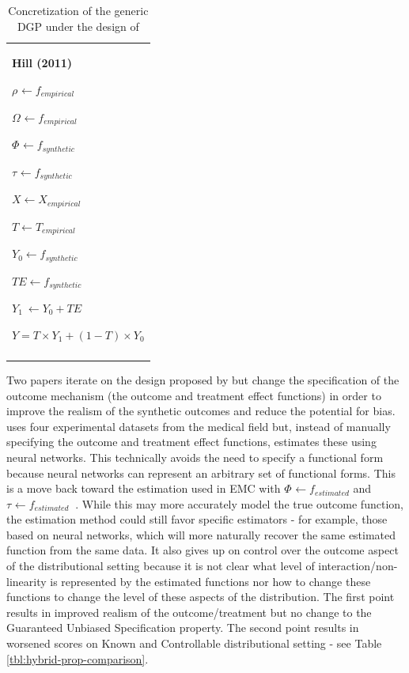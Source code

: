 \documentclass[../main.tex]{subfiles}
\begin{document}
\begin{table}[H]
             \centering
\begin{tabular}{p{3.14in}}
\hline
\multicolumn{1}{|p{3.14in}|}{\textbf{Hill (2011)} \par  \(  \rho _{} \leftarrow f_{empirical}~ \)  \par  \(  \Omega _{} \leftarrow f_{empirical} \)  \par  \(  \Phi _{} \leftarrow f_{synthetic} \)  \par  \(  \tau_{} \leftarrow f_{synthetic}~ \)  \par  \( X \leftarrow X_{empirical} \)  \par  \( T \leftarrow T_{empirical} \)  \par  \( Y_{0} \leftarrow f_{synthetic} \)  \par  \( TE \leftarrow f_{synthetic} \)  \par  \( Y_{1}~ \leftarrow Y_{0}+ TE \)  \par  \( Y = T \times Y_{1}+  \left( 1-T \right)  \times Y_{0} \)  \par } \\
\hhline{-}

\end{tabular}
\caption{Concretization of the generic DGP under the design of \textcite{Hill2011BayesianInference}}
\label{tbl:hill-hybrid}
\end{table}



\vspace{\baselineskip}
Two papers iterate on the design proposed by \textcite{Hill2011BayesianInference} but change the specification of the outcome mechanism (the outcome and treatment effect functions) in order to improve the realism of the synthetic outcomes and reduce the potential for bias. \textcite{Wendling2018ComparingDatabases} uses four experimental datasets from the medical field but, instead of manually specifying the outcome and treatment effect functions, estimates these using neural networks. This technically avoids the need to specify a functional form because neural networks can represent an arbitrary set of functional forms. This is a move back toward the estimation used in EMC with  \(  \Phi _{} \leftarrow f_{estimated} \)  and  \(  \tau_{} \leftarrow f_{estimated}~ \) . While this may more accurately model the true outcome function, the estimation method could still favor specific estimators - for example, those based on neural networks, which will more naturally recover the same estimated function from the same data. It also gives up on control over the outcome aspect of the distributional setting because it is not clear what level of interaction/non-linearity is represented by the estimated functions nor how to change these functions to change the level of these aspects of the distribution. The first point results in improved realism of the outcome/treatment but no change to the Guaranteed Unbiased Specification property. The second point results in worsened scores on Known and Controllable distributional setting - see Table \ref{tbl:hybrid-prop-comparison}.\par
\end{document}
